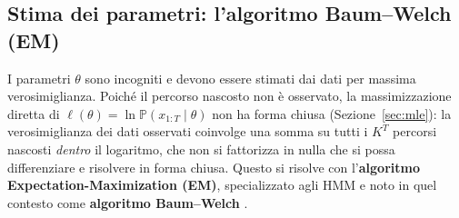 \documentclass[11pt]{article}
\theoremstyle{definition}
\theoremstyle{remark}
\begin{document}
\subsection{Stima dei parametri: l'algoritmo Baum--Welch (EM)}
\label{sec:baumwelch}

I parametri $\theta$ sono incogniti e devono essere stimati dai dati per massima verosimiglianza. Poich\'e il percorso nascosto non \`e osservato, la massimizzazione diretta di $\ell(\theta)=\ln\mathbb{P}(x_{1:T}\mid\theta)$ non ha forma chiusa (Sezione~\ref{sec:mle}): la verosimiglianza dei dati osservati coinvolge una somma su tutti i $K^T$ percorsi nascosti \emph{dentro} il logaritmo, che non si fattorizza in nulla che si possa differenziare e risolvere in forma chiusa. Questo si risolve con l'\textbf{algoritmo Expectation-Maximization (EM)}, specializzato agli HMM e noto in quel contesto come \textbf{algoritmo Baum--Welch} \cite{baum1970,rabiner1989}.
\end{document}
